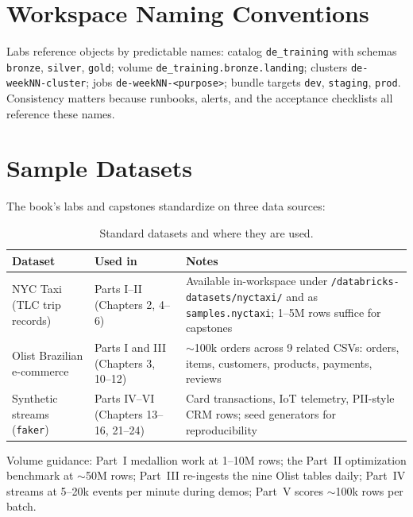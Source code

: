 \section{Workspace Naming Conventions}
%
Labs reference objects by predictable names: catalog \texttt{de\_training} with schemas
\texttt{bronze}, \texttt{silver}, \texttt{gold}; volume \texttt{de\_training.bronze.landing};
clusters \texttt{de-weekNN-cluster}; jobs \texttt{de-weekNN-<purpose>}; bundle targets
\texttt{dev}, \texttt{staging}, \texttt{prod}. Consistency matters because runbooks, alerts,
and the acceptance checklists all reference these names.

\section{Sample Datasets}
%
The book's labs and capstones standardize on three data sources:

\begin{table}[H]
\centering
\small
\begin{tabular}{@{}p{3.2cm}p{4.6cm}p{5.8cm}@{}}
\toprule
\textbf{Dataset} & \textbf{Used in} & \textbf{Notes} \\
\midrule
NYC Taxi (TLC trip records) & Parts I--II (Chapters 2, 4--6) & Available in-workspace under \texttt{/databricks-datasets/nyctaxi/} and as \texttt{samples.nyctaxi}; 1--5M rows suffice for capstones \cite{nycTaxiRegistry} \\
Olist Brazilian e-commerce & Parts I and III (Chapters 3, 10--12) & $\sim$100k orders across 9 related CSVs: orders, items, customers, products, payments, reviews \cite{olistDataset} \\
Synthetic streams (\texttt{faker}) & Parts IV--VI (Chapters 13--16, 21--24) & Card transactions, IoT telemetry, PII-style CRM rows; seed generators for reproducibility \cite{fakerPython} \\
\bottomrule
\end{tabular}
\caption{Standard datasets and where they are used.}
\label{tab:appendixa-datasets}
\end{table}

Volume guidance: Part~I medallion work at 1--10M rows; the Part~II optimization benchmark at
$\sim$50M rows; Part~III re-ingests the nine Olist tables daily; Part~IV streams at 5--20k events
per minute during demos; Part~V scores $\sim$100k rows per batch.

